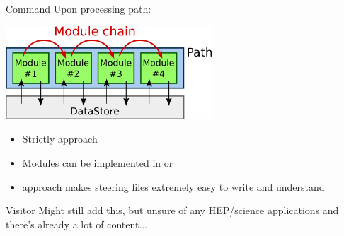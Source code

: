 \begin{frame}{Command}
	Upon processing path:
	\begin{center}
	\includegraphics[height=3.5cm]{figures/patterns/behavioral/ModulePath.png}
	\end{center}
	
	\bigskip
	\begin{itemize}
		\item Strictly  approach 
		\item Modules can be implemented in  or 
		\item {} approach makes steering files extremely easy to write and understand 
	\end{itemize}
\end{frame}

%	

\begin{frame}{Visitor}
	Might still add this, but unsure of any HEP/science applications and there's already a lot of content...
\end{frame}